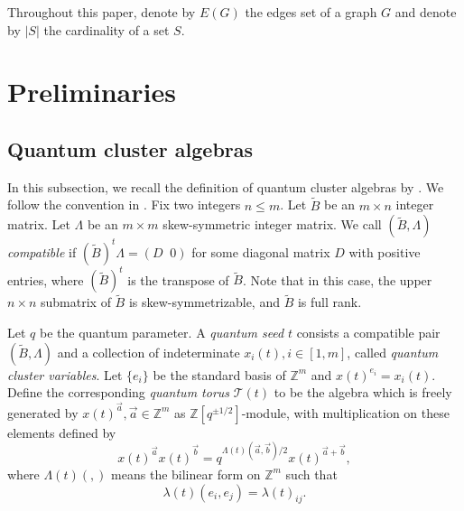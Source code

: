 \documentclass[10pt]{amsart}
\theoremstyle{theorems}
\begin{document}
\medskip

Throughout this paper, denote by $E(G)$ the edges set of a graph $G$ and denote by $|S|$ the cardinality of a set $S$.

\section{Preliminaries}\label{pre}

\subsection{Quantum cluster algebras}

In this subsection, we recall the definition of quantum cluster algebras by \cite{BZ}. We follow the convention in \cite{Q}. Fix two integers $n\leq m$. Let $\widetilde B$ be an $m\times n$ integer matrix. Let $\Lambda$ be an $m\times m$ skew-symmetric integer matrix. We call $(\widetilde B,\Lambda)$ \emph{compatible} if $(\widetilde B)^t \Lambda=(D\;\;0)$ for some diagonal matrix $D$ with positive entries, where $(\widetilde B)^t$ is the transpose of $\widetilde B$. Note that in this case, the upper $n\times n$ submatrix of $\widetilde B$ is skew-symmetrizable, and $\widetilde B$ is full rank.

\medskip

Let $q$ be the quantum parameter. A \emph{quantum seed} $t$ consists a compatible pair $(\widetilde B,\Lambda)$ and a collection of indeterminate $x_i(t),i\in [1,m]$, called \emph{quantum cluster variables}. Let $\{e_i\}$ be the standard basis of $\mathbb Z^m$ and $x(t)^{e_i}=x_i(t)$. Define the corresponding \emph{quantum torus} $\mathcal T(t)$ to be the algebra which is freely generated by $x(t)^{\vec{a}},\vec{a}\in \mathbb Z^m$ as $\mathbb Z[q^{\pm 1/2}]$-module, with multiplication on these elements defined by
$$x(t)^{\vec{a}}x(t)^{\vec{b}}=q^{\Lambda(t)(\vec{a},\vec{b})/2}x(t)^{\vec{a}+\vec{b}},$$
where $\Lambda(t)(,)$ means the bilinear form on $\mathbb Z^m$ such that
$$\lambda(t)(e_i,e_j)=\lambda(t)_{ij}.$$
\end{document}
